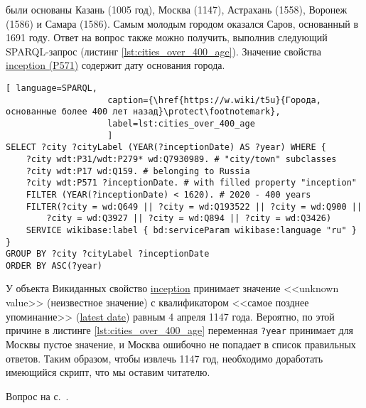 \begin{task}
    \label{answer:cities_over_400_age}
     были основаны Казань (1005 год), Москва (1147), Астрахань (1558), Воронеж (1586) и Самара (1586). Самым молодым городом оказался Саров, основанный в 1691 году. Ответ на вопрос также можно получить, выполнив следующий SPARQL-запрос (листинг \ref{lst:cities_over_400_age}). Значение свойства \href{https://www.wikidata.org/wiki/Property:P571}{inception (P571)} содержит дату основания города.


    
    \begin{lstlisting}[ language=SPARQL, 
                    caption={\href{https://w.wiki/t5u}{Города, основанные более 400 лет назад}\protect\footnotemark},
                    label=lst:cities_over_400_age
                    ]
SELECT ?city ?cityLabel (YEAR(?inceptionDate) AS ?year) WHERE {
	?city wdt:P31/wdt:P279* wd:Q7930989. # "city/town" subclasses
	?city wdt:P17 wd:Q159. # belonging to Russia
	?city wdt:P571 ?inceptionDate. # with filled property "inception"  
	FILTER (YEAR(?inceptionDate) < 1620). # 2020 - 400 years
	FILTER(?city = wd:Q649 || ?city = wd:Q193522 || ?city = wd:Q900 ||
		?city = wd:Q3927 || ?city = wd:Q894 || ?city = wd:Q3426)
	SERVICE wikibase:label { bd:serviceParam wikibase:language "ru" }
}
GROUP BY ?city ?cityLabel ?inceptionDate
ORDER BY ASC(?year)
\end{lstlisting}

У объекта Викиданных  
    свойство \href{https://www.wikidata.org/wiki/Property:P571}{inception} 
    принимает значение <<unknown value>> (неизвестное значение) 
    с квалификатором <<самое позднее упоминание>> 
    (\href{https://www.wikidata.org/wiki/Property:P1326}{latest date}) равным 4 апреля 1147 года. 
    Вероятно, по этой причине в листинге \ref{lst:cities_over_400_age} 
    переменная \lstinline|?year| принимает для Москвы пустое значение, 
    и Москва ошибочно не попадает в список правильных ответов. 
    Таким образом, чтобы извлечь 1147 год, необходимо доработать имеющийся скрипт, что мы оставим читателю. 



    \small{Вопрос на с.~\pageref{fig:city_relation_Russia_S_N}.}
\end{task}

